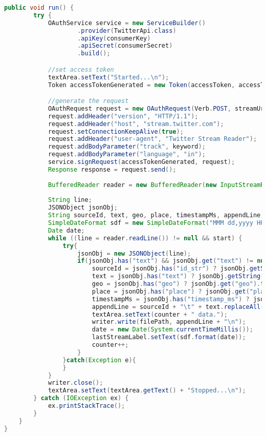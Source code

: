 \begin{lstlisting}[language=Java,basicstyle=\tiny,caption=TwitterStreamer.java]
    public void run() {
        try {
            OAuthService service = new ServiceBuilder()
                    .provider(TwitterApi.class)
                    .apiKey(consumerKey)
                    .apiSecret(consumerSecret)
                    .build();

            //set access token
            textArea.setText("Started...\n");
            Token accessTokenGenerated = new Token(accessToken, accessTokenSecret);

            //generate the request
            OAuthRequest request = new OAuthRequest(Verb.POST, streamUrl);
            request.addHeader("version", "HTTP/1.1");
            request.addHeader("host", "stream.twitter.com");
            request.setConnectionKeepAlive(true);
            request.addHeader("user-agent", "Twitter Stream Reader");
            request.addBodyParameter("track", keyword); 
            request.addBodyParameter("language", "in");
            service.signRequest(accessTokenGenerated, request);
            Response response = request.send();
            
            BufferedReader reader = new BufferedReader(new InputStreamReader(response.getStream()));
            
            String line;
            JSONObject jsonObj;
            String sourceId, text, geo, place, timestampMs, appendLine;
            SimpleDateFormat sdf = new SimpleDateFormat("MMM dd,yyyy HH:mm:ss");    
            Date date;
            while ((line = reader.readLine()) != null && start) {
                try{
                    jsonObj = new JSONObject(line);
                    if(jsonObj.has("text") && jsonObj.get("text") != null){
                        sourceId = jsonObj.has("id_str") ? jsonObj.getString("id_str") : null;
                        text = jsonObj.has("text") ? jsonObj.getString("text") : null;
                        geo = jsonObj.has("geo") ? jsonObj.get("geo").toString() : null;
                        place = jsonObj.has("place") ? jsonObj.get("place").toString() : null;
                        timestampMs = jsonObj.has("timestamp_ms") ? jsonObj.getString("timestamp_ms") : null;
                        appendLine = sourceId + "\t" + text.replaceAll("\\n", " ") + "\t" + geo + "\t" + place + "\t" + timestampMs + "\t";
                        textArea.setText(counter + " data.");
                        writer.write(filePath, appendLine + "\n");
                        date = new Date(System.currentTimeMillis());
                        lastStreamLabel.setText(sdf.format(date));
                        counter++;
                    }
                }catch(Exception e){
                }
            }
            writer.close();
            textArea.setText(textArea.getText() + "Stopped...\n");
        } catch (IOException ex) {
            ex.printStackTrace();
        }
    }
}
\end{lstlisting}

